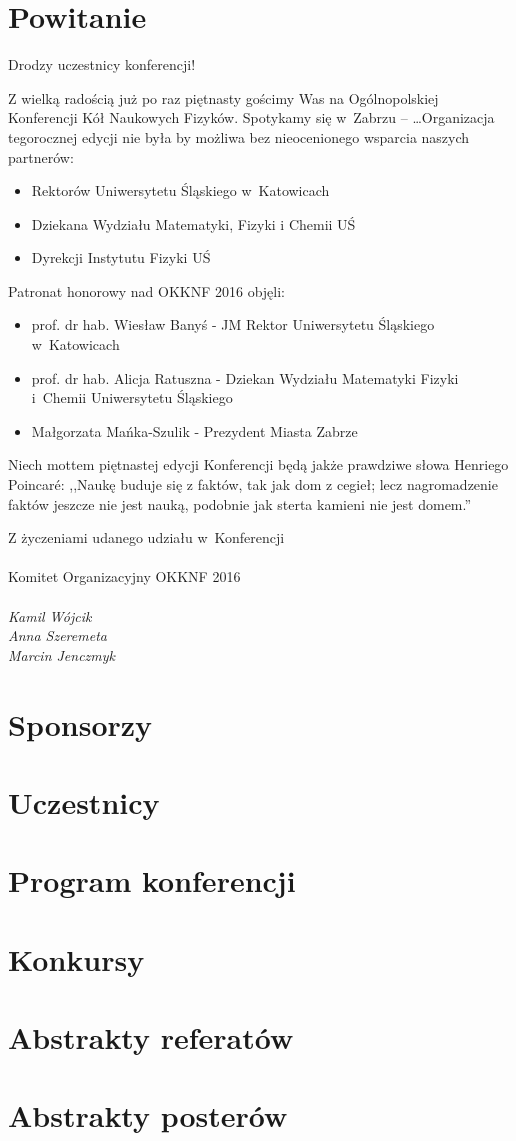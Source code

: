 \documentclass[13pt, a4paper, oneside, notitlepage]{article}
\begin{document}
\section{Powitanie}

Drodzy uczestnicy konferencji!

Z wielką radością już po raz piętnasty gościmy Was na Ogólnopolskiej Konferencji Kół Naukowych Fizyków. Spotykamy się w~Zabrzu -- \ldots Organizacja tegorocznej edycji nie była by możliwa bez nieocenionego wsparcia naszych partnerów:
\begin{itemize}
	\item Rektorów Uniwersytetu Śląskiego w~Katowicach
	\item Dziekana Wydziału Matematyki, Fizyki i Chemii UŚ
	\item Dyrekcji Instytutu Fizyki UŚ
\end{itemize}

Patronat honorowy nad OKKNF 2016 objęli:
\begin{itemize}
	\item prof. dr hab. Wiesław Banyś - 
JM Rektor Uniwersytetu Śląskiego w~Katowicach
	\item prof. dr hab. Alicja Ratuszna - 
Dziekan Wydziału Matematyki Fizyki i~Chemii Uniwersytetu Śląskiego
	\item Małgorzata Mańka-Szulik - 
Prezydent Miasta Zabrze
\end{itemize}

Niech mottem piętnastej edycji Konferencji będą jakże prawdziwe słowa Henriego Poincaré: ,,Naukę buduje się z faktów, tak jak dom z cegieł; lecz nagromadzenie faktów jeszcze nie jest nauką, podobnie jak sterta kamieni nie jest domem.''

Z życzeniami udanego udziału w~Konferencji \\
\\
Komitet Organizacyjny OKKNF 2016 \\
\\
\textit{Kamil Wójcik \\
Anna Szeremeta \\
Marcin Jenczmyk
}

\newpage
\section{Sponsorzy}

\newpage
\section{Uczestnicy}

\newpage
\section{Program konferencji}

\newpage
\section{Konkursy}

\newpage
\section{Abstrakty referatów}

\newpage
\section{Abstrakty posterów}
\end{document}
